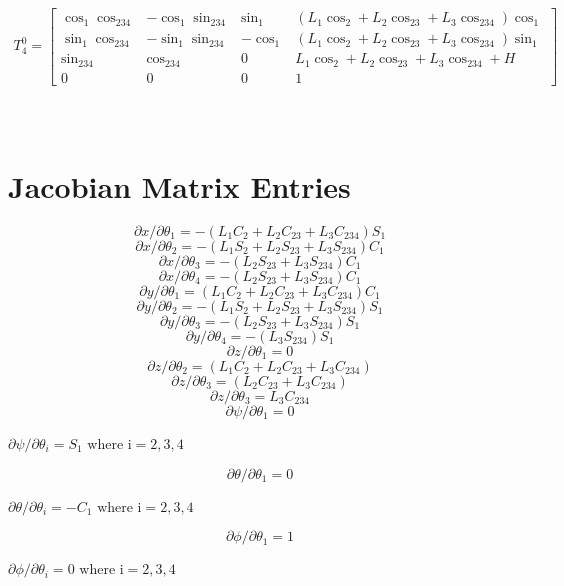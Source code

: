 \documentclass[paper=letter, fontsize=10pt]{scrartcl}	%
\numberwithin{equation}{section}															%
\numberwithin{figure}{section}																%
\numberwithin{table}{section}																%
\begin{document}
\begin{align}
T_4^0 = 
	\begin{bmatrix}
	\cos_1 \cos_{234} 	& -\cos_1 \sin_{234} 	& \sin_1 	& (L_1\cos_2+L_2\cos_{23}+L_3\cos_{234})\cos_1 \\
  	\sin_1 \cos_{234} 	& -\sin_1 \sin_{234}  	& -\cos_1 	& (L_1\cos_2+L_2\cos_{23}+L_3\cos_{234})\sin_1 \\
  	\sin_{234}			& \cos_{234}  			& 0 		& L_1\cos_2+L_2\cos_{23}+L_3\cos_{234} + H \\
  	0					& 0  					& 0 		& 1 
	\end{bmatrix}
\end{align}


\newpage
\section{\\Jacobian Matrix Entries} \label{App:AppendixB}


\[\partial x/\partial {\theta _1} =  - ({L_1}{C_2} + {L_2}{C_{23}} + {L_3}{C_{234}}){S_1}\]
\[\partial x/\partial {\theta _2} =  - ({L_1}{S_2} + {L_2}{S_{23}} + {L_3}{S_{234}}){C_1}\]
\[\partial x/\partial {\theta _3} =  - ({L_2}{S_{23}} + {L_3}{S_{234}}){C_1}\]
\[\partial x/\partial {\theta _4} =  - ({L_2}{S_{23}} + {L_3}{S_{234}}){C_1}\]
\[\partial y/\partial {\theta _1} = ({L_1}{C_2} + {L_2}{C_{23}} + {L_3}{C_{234}}){C_1}\]
\[\partial y/\partial {\theta _2} =  - ({L_1}{S_2} + {L_2}{S_{23}} + {L_3}{S_{234}}){S_1}\]
\[\partial y/\partial {\theta _3} =  - ({L_2}{S_{23}} + {L_3}{S_{234}}){S_1}\]
\[\partial y/\partial {\theta _4} =  - ({L_3}{S_{234}}){S_1}\]
\[\partial z/\partial {\theta _1} = 0\]
\[\partial z/\partial {\theta _2} = ({L_1}{C_2} + {L_2}{C_{23}} + {L_3}{C_{234}})\]
\[\partial z/\partial {\theta _3} = ({L_2}{C_{23}} + {L_3}{C_{234}})\]
\[\partial z/\partial {\theta _3} = {L_3}{C_{234}}\]
\[\partial \psi /\partial {\theta _1} = 0\]
\begin{center}
$\partial \psi /\partial {\theta _i} = {S_1}	\text{ where i}=2,3,4$
\end{center}

\[\partial \theta /\partial {\theta _1} = 0\]
\begin{center}
$\partial \theta /\partial {\theta _i} =  - {C_1}	\text{ where i}=2,3,4$
\end{center}

\[\partial \phi /\partial {\theta _1} = 1\]
\begin{center}
$\partial \phi /\partial {\theta _i} = 0		\text{ where i}=2,3,4$
\end{center}
\newpage
\end{document}
